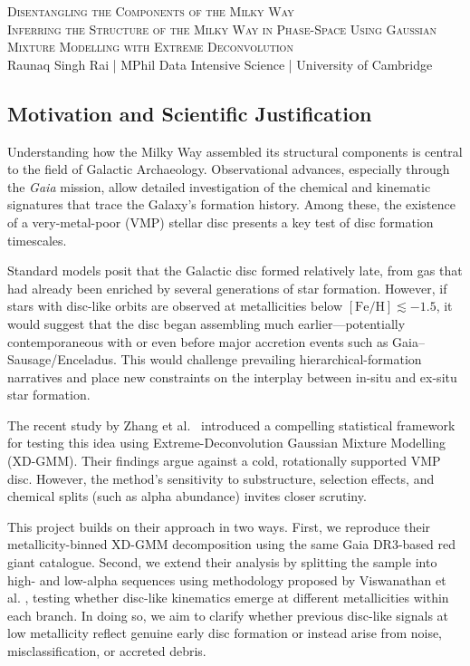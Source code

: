 \documentclass[a4paper,10pt]{article}
\begin{document}
\begin{center}
    {\Large \textsc{Disentangling the Components of the Milky Way}}\\[0.2cm]
    {\textsc{Inferring the Structure of the Milky Way in Phase-Space Using Gaussian Mixture Modelling with Extreme Deconvolution}}\\[0.2cm]
    Raunaq Singh Rai \quad | \quad MPhil Data Intensive Science \quad | \quad University of Cambridge
\end{center}

\begin{multicols}{2}

\subsection*{Motivation and Scientific Justification}

Understanding how the Milky Way assembled its structural components is central to the field of 
Galactic Archaeology. Observational advances, especially through the \textit{Gaia} mission, allow detailed investigation 
of the chemical and kinematic signatures that trace the Galaxy’s formation history. Among these, the existence of a 
very-metal-poor (VMP) stellar disc presents a key test of disc formation timescales.

Standard models posit that the Galactic disc formed relatively late, from gas that had already been enriched by several 
generations of star formation. However, if stars with disc-like orbits are observed at metallicities below $[\mathrm{Fe/H}] 
\lesssim -1.5$, it would suggest that the disc began assembling much earlier—potentially contemporaneous with or even before 
major accretion events such as Gaia–Sausage/Enceladus. This would challenge prevailing hierarchical-formation narratives and 
place new constraints on the interplay between in-situ and ex-situ star formation.

The recent study by Zhang et al.~\cite{zhang2024existencemetalpoordiscmilky} introduced a compelling statistical framework for 
testing this idea using Extreme-Deconvolution Gaussian Mixture Modelling (XD-GMM). Their findings argue against a cold, 
rotationally supported VMP disc. However, the method’s sensitivity to substructure, selection effects, and chemical splits 
(such as alpha abundance) invites closer scrutiny.

This project builds on their approach in two ways. First, we reproduce their metallicity-binned XD-GMM decomposition using 
the same Gaia DR3-based red giant catalogue. Second, we extend their analysis by splitting the sample into high- and low-alpha 
sequences using methodology proposed by Viswanathan et al. \cite{Vis2024}, testing whether disc-like kinematics emerge at different metallicities within each branch. In doing so, we aim to 
clarify whether previous disc-like signals at low metallicity reflect genuine early disc formation or instead arise from noise, 
misclassification, or accreted debris.


\end{multicols}
\end{document}
